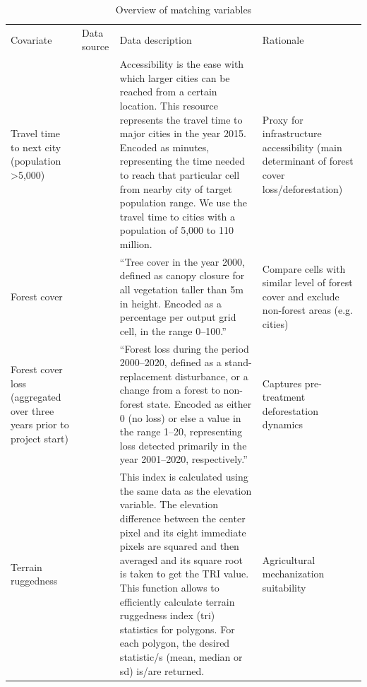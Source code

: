 \documentclass{article}
\begin{document}
\begin{table}[h]
\caption{Overview of matching variables}
\label{tab:matchvar}
\begin{tabular}{L{2cm}L{2cm}L{9cm}L{3cm}}
\toprule
Covariate  & Data source & Data description  & Rationale \\
Travel time to next city (population >5,000)                           & \cite{weiss2018global}                         & Accessibility is the ease with which larger cities can be reached from a certain location. This resource represents the travel time to major cities in the year 2015. Encoded as minutes, representing the time needed to reach that particular cell from nearby city of target population range. We use the travel time to cities with a population of 5,000 to 110 million.                                                   & Proxy for infrastructure accessibility (main determinant of forest cover loss/deforestation) \\
Forest cover                                                           & \cite{hansen2013high}                         & ``Tree cover in the year 2000, defined as canopy closure for all vegetation taller than 5m in height. Encoded as a percentage per output grid cell, in the range 0–100.''                                                                                                                                                                                                                                                         & Compare cells with similar level of forest cover and exclude non-forest areas (e.g. cities)  \\
Forest cover loss (aggregated over three years prior to project start) & \cite{hansen2013high}                         & ``Forest loss during the period 2000–2020, defined as a stand-replacement disturbance, or a change from a forest to non-forest state. Encoded as either 0 (no loss) or else a value in the range 1–20, representing loss detected primarily in the year 2001–2020, respectively.''                                                                                                                                                & Captures pre-treatment deforestation dynamics                                                \\
Terrain ruggedness                                                     & \cite{farr2007shuttle, riley1999index} & This index is calculated using the same data as the elevation variable. The elevation difference between the center pixel and its eight immediate pixels are squared and then averaged and its square root is taken to get the TRI value. This function allows to efficiently calculate terrain ruggedness index (tri) statistics for polygons. For each polygon, the desired statistic/s (mean, median or sd) is/are returned. & Agricultural mechanization suitability                                                       \\

\end{tabular}
\end{table}
\end{document}
